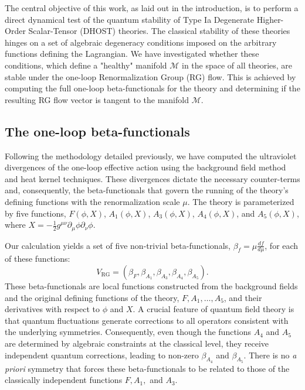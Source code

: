 \documentclass[twocolumn]{aastex631}
\begin{document}
The central objective of this work, as laid out in the introduction, is to perform a direct dynamical test of the quantum stability of Type Ia Degenerate Higher-Order Scalar-Tensor (DHOST) theories. The classical stability of these theories hinges on a set of algebraic degeneracy conditions imposed on the arbitrary functions defining the Lagrangian. We have investigated whether these conditions, which define a "healthy" manifold $\mathcal{M}$ in the space of all theories, are stable under the one-loop Renormalization Group (RG) flow. This is achieved by computing the full one-loop beta-functionals for the theory and determining if the resulting RG flow vector is tangent to the manifold $\mathcal{M}$.

\subsection{The one-loop beta-functionals}

Following the methodology detailed previously, we have computed the ultraviolet divergences of the one-loop effective action using the background field method and heat kernel techniques. These divergences dictate the necessary counter-terms and, consequently, the beta-functionals that govern the running of the theory's defining functions with the renormalization scale $\mu$. The theory is parameterized by five functions, $F(\phi,X)$, $A_1(\phi,X)$, $A_3(\phi,X)$, $A_4(\phi,X)$, and $A_5(\phi,X)$, where $X = - \frac{1}{2} g^{\mu\nu} \partial_\mu\phi \partial_\nu\phi$.

Our calculation yields a set of five non-trivial beta-functionals, $\beta_f = \mu \frac{df}{d\mu}$, for each of these functions:
\begin{equation}
    V_{\text{RG}} = (\beta_F, \beta_{A_1}, \beta_{A_3}, \beta_{A_4}, \beta_{A_5}).
\end{equation}
These beta-functionals are local functions constructed from the background fields and the original defining functions of the theory, $F, A_1, \dots, A_5$, and their derivatives with respect to $\phi$ and $X$. A crucial feature of quantum field theory is that quantum fluctuations generate corrections to all operators consistent with the underlying symmetries. Consequently, even though the functions $A_4$ and $A_5$ are determined by algebraic constraints at the classical level, they receive independent quantum corrections, leading to non-zero $\beta_{A_4}$ and $\beta_{A_5}$. There is no \textit{a priori} symmetry that forces these beta-functionals to be related to those of the classically independent functions $F, A_1,$ and $A_3$.
\end{document}
